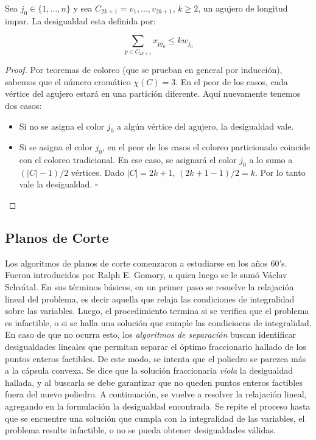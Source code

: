 Sea $j_0 \in \{1,...,n\}$ y sea $C_{2k+1} = v_1,...,v_{2k+1}$, $k \geq 2$, un agujero de longitud impar. La desigualdad esta definida por:

\begin{equation}
\sum_{p \in C_{2k+1}} x_{pj_0} \leq k w_{j_0}
\end{equation}

\begin{proof}
Por teoremas de coloreo (que se prueban en general por inducción), sabemos que el número cromático $\chi(C) = 3$. En el peor de los casos, cada vértice del agujero estará en una partición diferente. Aquí nuevamente tenemos dos casos:

\begin{itemize}
\item Si no se asigna el color $j_0$ a algún vértice del agujero, la desigualdad vale.
\item Si se asigna el color $j_0$, en el peor de los casos el coloreo particionado coincide con el coloreo tradicional. En ese caso, se asignará el color $j_0$ a lo sumo a $(|C|-1)/2$ vértices. Dado $|C| = 2k+1$,  $(2k+1-1)/2 = k$. Por lo tanto vale la desigualdad.  \hfill $\square$
\end{itemize}

\end{proof}

\subsection{Planos de Corte}

Los algoritmos de planos de corte comenzaron a estudiarse en los años 60's. Fueron introducidos por Ralph E. Gomory, a quien luego se le sumó Václav Schvátal. En sus términos básicos, en un primer paso se resuelve la relajación lineal del problema, es decir aquella que relaja las condiciones de integralidad sobre las variables. Luego, el procedimiento termina si se verifica que el problema es infactible, o si se halla una solución que cumple las condicioens de integralidad. En caso de que no ocurra esto, los \textit{algoritmos de separación} buscan identificar desigualdades lineales que permitan separar el óptimo fraccionario hallado de los puntos enteros factibles. De este modo, se intenta que el poliedro se parezca más a la cápsula convexa. Se dice que la solución fraccionaria \textit{viola} la desigualdad hallada, y al buscarla se debe garantizar que no queden puntos enteros factibles fuera del nuevo poliedro. A continuación, se vuelve a resolver la relajación lineal, agregando en la formulación la desigualdad encontrada. Se repite el proceso hasta que se encuentre una solución que cumpla con la integralidad de las variables, el problema resulte infactible, o no se pueda obtener desigualdades válidas.


